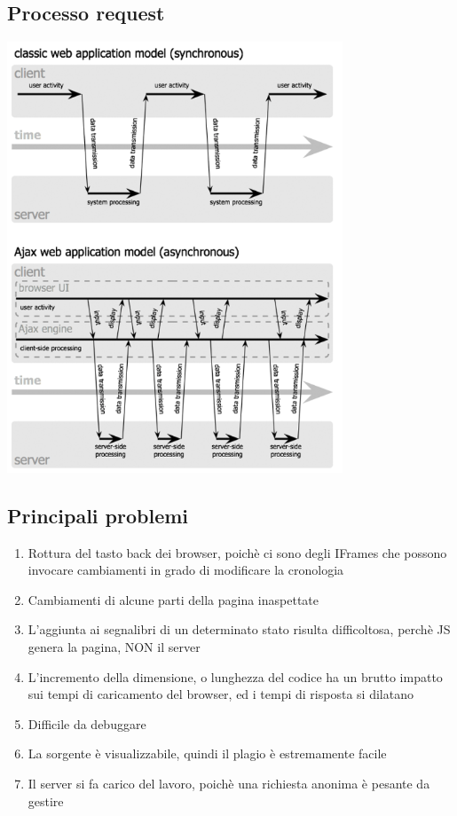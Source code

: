 \documentclass[12pt, a4paper, openany, twoside]{book}
\begin{document}
\subsection{Processo request}
\begin{center}
\includegraphics[width=0.75\textwidth]{28}
\end{center}
\subsection{Principali problemi}
\begin{enumerate}
	\item Rottura del tasto back dei browser, poichè ci sono degli IFrames che
	possono invocare cambiamenti in grado di modificare la cronologia
	\item Cambiamenti di alcune parti della pagina inaspettate
	\item L'aggiunta ai segnalibri di un determinato stato risulta difficoltosa,
	perchè JS genera la pagina, NON il server
	\item L'incremento della dimensione, o lunghezza del codice ha un brutto 
	impatto sui tempi di caricamento del browser, ed i tempi di risposta si
	dilatano
	\item Difficile da debuggare
	\item La sorgente è visualizzabile, quindi il plagio è estremamente facile
	\item Il server si fa carico del lavoro, poichè una richiesta anonima è 
	pesante da gestire
\end{enumerate}
\end{document}
